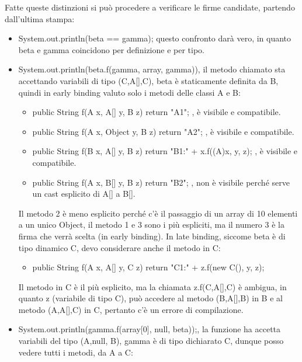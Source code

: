         Fatte queste distinzioni si può procedere a verificare le firme candidate, partendo dall'ultima 
        stampa:
        \begin{itemize}
            \item System.out.println(beta == gamma); questo confronto darà vero, in quanto beta e gamma
            coincidono per definizione e per tipo.
            \item  System.out.println(beta.f(gamma, array, gamma)), il metodo chiamato sta accettando 
            variabili di tipo (C,A[],C), beta è staticamente definita da B, quindi in early binding 
            valuto solo i metodi delle classi A e B:
            \begin{itemize}
                \item public String f(A x, A[] y, B z) { return "A1"; }, è visibile e compatibile.
                \item public String f(A x, Object y, B z) { return "A2"; }, è visibile e compatibile.
                \item public String f(B x, A[] y, B z) { return "B1:" + x.f((A)x, y, z); }, è visibile
                e compatibile.
                \item public String f(A x, B[] y, B z) { return "B2"; }, non è visibile perché serve un 
                cast esplicito di A[] a B[].
            \end{itemize}
            Il metodo 2 è meno esplicito perché c'è il passaggio di un array di 10 elementi a un unico Object,
            il metodo 1 e 3 sono i più espliciti, ma il numero 3 è la firma che verrà scelta (in early binding).
            In late binding, siccome beta è di tipo dinamico C, devo considerare anche il metodo in C:
            \begin{itemize}
                \item public String f(A x, A[] y, C z) { return "C1:" + z.f(new C(), y, z); }
            \end{itemize}
            Il metodo in C è il più esplicito, ma la chiamata z.f(C,A[],C) è ambigua, in quanto z 
            (variabile di tipo C), può accedere al metodo (B,A[],B) in B e al metodo (A,A[],C) in C,
            pertanto c'è un errore di compilazione.
            \item System.out.println(gamma.f(array[0], null, beta));, la funzione ha accetta variabili
            del tipo (A,null, B), gamma è di tipo dichiarato C, dunque posso vedere tutti i metodi, 
            da A a C:
            \begin{enumerate}

\end{enumerate}
\end{itemize}
